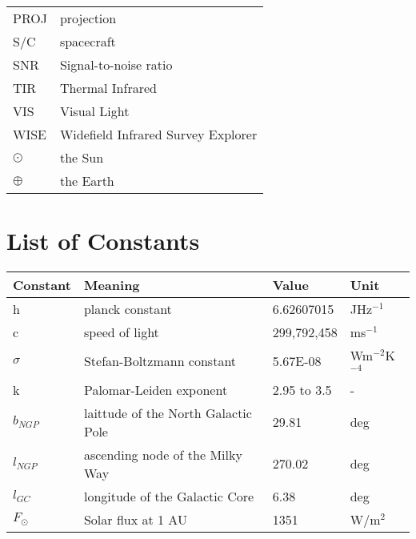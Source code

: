 \begin{table}[h!]
\begin{tabular}{l|l}
PROJ                  & projection                                                      \\
S/C                   & spacecraft                                                      \\
SNR                   & Signal-to-noise ratio                                           \\
TIR                   & Thermal Infrared                                                \\
VIS                   & Visual Light                                                    \\
WISE                  & Widefield Infrared Survey Explorer                              \\
$\odot$                  & the Sun                                                         \\
$\oplus$                 & the Earth                                                      
\end{tabular}
\end{table}

\chapter*{List of Constants}

\begin{table}[h!]
\centering
\begin{tabular}{l|l|l|l}
\textbf{Constant} & \textbf{Meaning}                    & \textbf{Value} & \textbf{Unit} \\ \hline
h                 & planck constant                     & 6.62607015     & JHz$^{-1}$         \\
c                 & speed of light                      & 299,792,458      & ms$^{-1}$           \\
$\sigma$             & Stefan-Boltzmann constant           & 5.67E-08       & Wm$^{-2}$K$^{-4}$       \\
k                 & Palomar-Leiden exponent             & 2.95 to 3.5    & -             \\
$b_{NGP}$              & laittude of the North Galactic Pole & 29.81          & deg           \\
$l_{NGP}$              & ascending node of the Milky Way     & 270.02         & deg           \\
$l_{GC}$               & longitude of the Galactic Core      & 6.38           & deg           \\
$F_{\odot}$            & Solar flux at 1 AU                  & 1351           & W/m$^2$         
\end{tabular}
\end{table}
